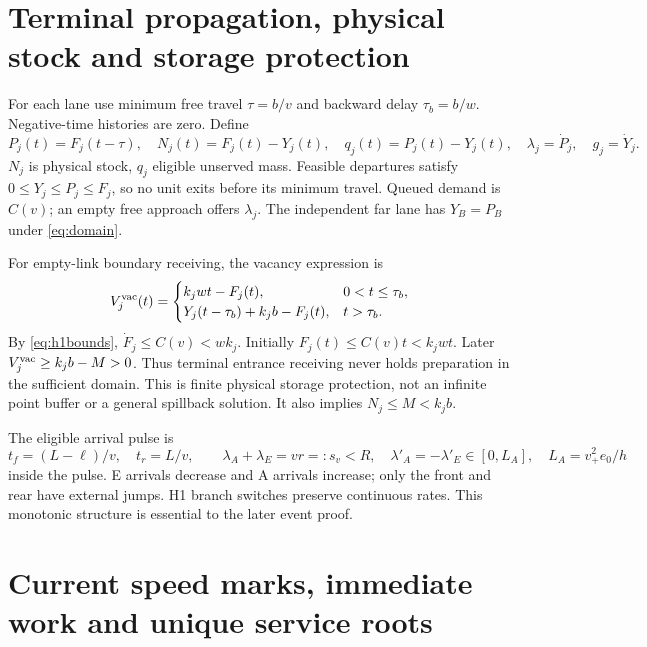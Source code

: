 \section{Terminal propagation, physical stock and storage protection}
\label{sec:terminal}
For each lane use minimum free travel $\tau=b/v$ and backward delay
$\tau_b=b/w$. Negative-time histories are zero. Define
\begin{equation}
 P_j(t)=F_j(t-\tau),\quad
 N_j(t)=F_j(t)-Y_j(t),\quad
 q_j(t)=P_j(t)-Y_j(t),\quad
 \lambda_j=\dot P_j,\quad g_j=\dot Y_j.
 \label{eq:terminalcounts}
\end{equation}
$N_j$ is physical stock, $q_j$ eligible unserved mass. Feasible departures
satisfy $0\leq Y_j\leq P_j\leq F_j$, so no unit exits before its minimum
travel. Queued demand is $C(v)$; an empty free approach offers $\lambda_j$.
The independent far lane has $Y_B=P_B$ under \eqref{eq:domain}.

For empty-link boundary receiving, the vacancy expression is
\begin{equation}
 V_j^{\rm vac}(t)=\begin{cases}
 k_jwt-F_j(t),&0<t\leq\tau_b,\\
 Y_j(t-\tau_b)+k_jb-F_j(t),&t>\tau_b.
 \end{cases} \label{eq:vacancy}
\end{equation}
By \eqref{eq:h1bounds}, $\dot F_j\leq C(v)<wk_j$. Initially
$F_j(t)\leq C(v)t<k_jwt$. Later
$V_j^{\rm vac}\geq k_jb-M>0$. Thus terminal entrance receiving never
holds preparation in the sufficient domain. This is finite physical
storage protection, not an infinite point buffer or a general spillback
solution. It also implies $N_j\leq M<k_jb$.

The eligible arrival pulse is
\begin{equation}
 t_f=(L-\ell)/v,\quad t_r=L/v,\qquad
 \lambda_A+\lambda_E=vr=:s_v<R,\quad
 \lambda'_A=-\lambda'_E\in[0,L_A],\quad L_A=v_+^2e_0/h
 \label{eq:pulse}
\end{equation}
inside the pulse. E arrivals decrease and A arrivals increase; only the
front and rear have external jumps. H1 branch switches preserve continuous
rates. This monotonic structure is essential to the later event proof.

\section{Current speed marks, immediate work and unique service roots}
\label{sec:root}
